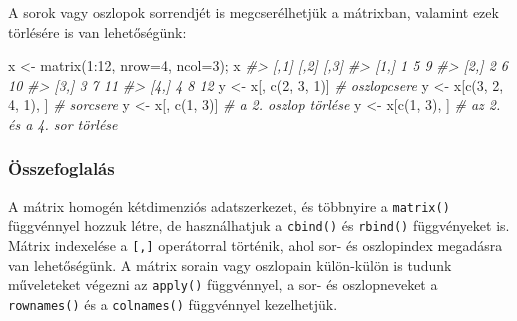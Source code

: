 \documentclass[
]{book}
\makeatletter
\newenvironment{Shaded}{\begin{snugshade}}{\end{snugshade}}
\newcommand{\AttributeTok}[1]{\textcolor[rgb]{0.77,0.63,0.00}{#1}}
\newcommand{\CommentTok}[1]{\textcolor[rgb]{0.56,0.35,0.01}{\textit{#1}}}
\newcommand{\DecValTok}[1]{\textcolor[rgb]{0.00,0.00,0.81}{#1}}
\newcommand{\FunctionTok}[1]{\textcolor[rgb]{0.00,0.00,0.00}{#1}}
\newcommand{\NormalTok}[1]{#1}
\newcommand{\OtherTok}[1]{\textcolor[rgb]{0.56,0.35,0.01}{#1}}
\newcommand{\SpecialCharTok}[1]{\textcolor[rgb]{0.00,0.00,0.00}{#1}}
\newenvironment{kframe}{%
\medskip{}
\setlength{\fboxsep}{.8em}
 \def\at@end@of@kframe{}%
 \ifinner\ifhmode%
  \def\at@end@of@kframe{\end{minipage}}%
  \begin{minipage}{\columnwidth}%
 \fi\fi%
 \def\FrameCommand##1{\hskip\@totalleftmargin \hskip-\fboxsep
 \colorbox{shadecolor}{##1}\hskip-\fboxsep
     \hskip-\linewidth \hskip-\@totalleftmargin \hskip\columnwidth}%
 \MakeFramed {\advance\hsize-\width
   \@totalleftmargin\z@ \linewidth\hsize
   \@setminipage}}%
 {\par\unskip\endMakeFramed%
 \at@end@of@kframe}
\newenvironment{rmdblock}[1]
  {
  \begin{itemize}
  \renewcommand{\labelitemi}{
    \raisebox{-.7\height}[0pt][0pt]{
      {\setkeys{Gin}{width=3em,keepaspectratio}\texttt{[image: images/\#1]}}
    }
  }
  \setlength{\fboxsep}{1em}
  \begin{kframe}
  \item
  }
  {
  \end{kframe}
  \end{itemize}
  }
\newenvironment{rmdsummary}
  {\begin{rmdblock}{summary}}
  {\end{rmdblock}}
\makeatother
\begin{document}
A sorok vagy oszlopok sorrendjét is megcserélhetjük a mátrixban, valamint ezek törlésére is van lehetőségünk:

\begin{Shaded}
\begin{Highlighting}[]
\NormalTok{x }\OtherTok{\textless{}{-}} \FunctionTok{matrix}\NormalTok{(}\DecValTok{1}\SpecialCharTok{:}\DecValTok{12}\NormalTok{, }\AttributeTok{nrow=}\DecValTok{4}\NormalTok{, }\AttributeTok{ncol=}\DecValTok{3}\NormalTok{); x}
\CommentTok{\#\textgreater{}      [,1] [,2] [,3]}
\CommentTok{\#\textgreater{} [1,]    1    5    9}
\CommentTok{\#\textgreater{} [2,]    2    6   10}
\CommentTok{\#\textgreater{} [3,]    3    7   11}
\CommentTok{\#\textgreater{} [4,]    4    8   12}
\NormalTok{y }\OtherTok{\textless{}{-}}\NormalTok{ x[, }\FunctionTok{c}\NormalTok{(}\DecValTok{2}\NormalTok{, }\DecValTok{3}\NormalTok{, }\DecValTok{1}\NormalTok{)]          }\CommentTok{\# oszlopcsere}
\NormalTok{y }\OtherTok{\textless{}{-}}\NormalTok{ x[}\FunctionTok{c}\NormalTok{(}\DecValTok{3}\NormalTok{, }\DecValTok{2}\NormalTok{, }\DecValTok{4}\NormalTok{, }\DecValTok{1}\NormalTok{), ]       }\CommentTok{\# sorcsere}
\NormalTok{y }\OtherTok{\textless{}{-}}\NormalTok{ x[, }\FunctionTok{c}\NormalTok{(}\DecValTok{1}\NormalTok{, }\DecValTok{3}\NormalTok{)]             }\CommentTok{\# a 2. oszlop törlése}
\NormalTok{y }\OtherTok{\textless{}{-}}\NormalTok{ x[}\FunctionTok{c}\NormalTok{(}\DecValTok{1}\NormalTok{, }\DecValTok{3}\NormalTok{), ]             }\CommentTok{\# az 2. és a 4. sor törlése}
\end{Highlighting}
\end{Shaded}

\hypertarget{az-r-nyelv-6-summary}{%
\subsubsection{Összefoglalás}\label{az-r-nyelv-6-summary}}

\begin{rmdsummary}
A mátrix homogén kétdimenziós adatszerkezet, és többnyire a
\texttt{matrix()} függvénnyel hozzuk létre, de használhatjuk a
\texttt{cbind()} és \texttt{rbind()} függvényeket is. Mátrix indexelése
a \texttt{{[},{]}} operátorral történik, ahol sor- és oszlopindex
megadásra van lehetőségünk. A mátrix sorain vagy oszlopain külön-külön
is tudunk műveleteket végezni az \texttt{apply()} függvénnyel, a sor- és
oszlopneveket a \texttt{rownames()} és a \texttt{colnames()} függvénnyel
kezelhetjük.
\end{rmdsummary}
\end{document}
